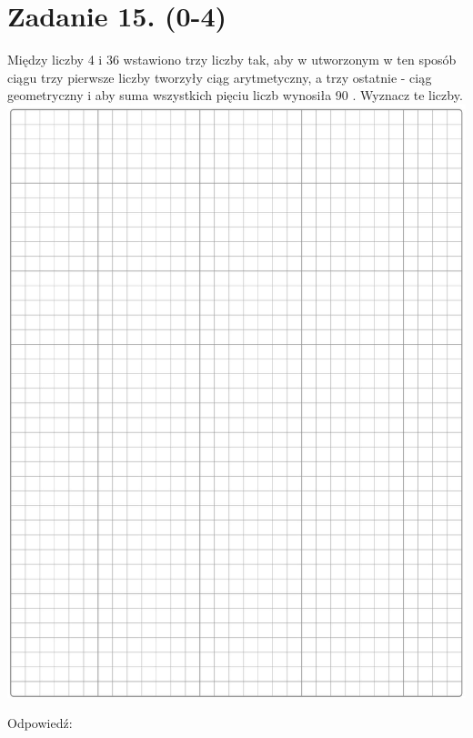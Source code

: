 \documentclass[10pt]{article}
\begin{document}
\section*{Zadanie 15. (0-4)}
Między liczby 4 i 36 wstawiono trzy liczby tak, aby w utworzonym w ten sposób ciągu trzy pierwsze liczby tworzyły ciąg arytmetyczny, a trzy ostatnie - ciąg geometryczny i aby suma wszystkich pięciu liczb wynosiła 90 . Wyznacz te liczby.\\
\includegraphics[max width=\textwidth, center]{2024_11_21_e30d1f37bf0e3631c088g-14}

Odpowiedź: \(\qquad\)
\end{document}
